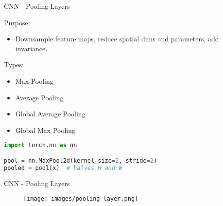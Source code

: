 \begin{frame}[fragile]{CNN - Pooling Layers}
\begin{block}{Purpose:}
    \begin{itemize}
        \item Downsample feature maps, reduce spatial dims and parameters, add invariance.
    \end{itemize}
\end{block}

\begin{block}{Types:}
    \begin{itemize}
        \item Max Pooling
        \item Average Pooling
        \item Global Average Pooling
        \item Global Max Pooling
    \end{itemize}
\end{block}

\begin{lstlisting}[language=Python, caption={Code snippet (PyTorch)}, basicstyle=\ttfamily\footnotesize]
import torch.nn as nn

pool = nn.MaxPool2d(kernel_size=2, stride=2)
pooled = pool(x)  # halves H and W
\end{lstlisting}
\end{frame}  

\begin{frame}{CNN - Pooling Layers}
    \begin{figure}
    \centering
    \texttt{[image: images/pooling-layer.png]}
    \end{figure}
\end{frame}